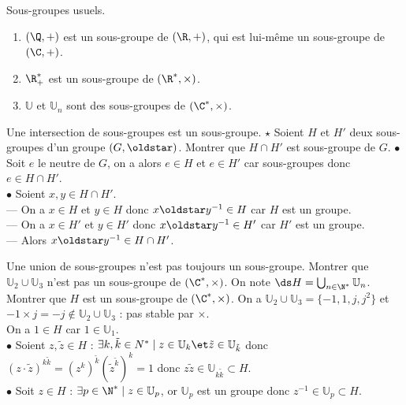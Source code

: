 \documentclass[11pt]{article}
\begin{document}
\begin{prop}{Sous-groupes usuels.}{}
    \begin{enumerate}
        \item $(\Q,+)$ est un sous-groupe de $(\R,+)$, qui est lui-même un sous-groupe de $(\C,+)$.
        \item $\R_+^*$ est un sous-groupe de $(\R^*,\times)$.
        \item $\mathbb{U}$ et $\mathbb{U}_n$ sont des sous-groupes de $(\C^*, \times)$.
    \end{enumerate}
\end{prop}

\begin{ex}{Une intersection de sous-groupes est un sous-groupe. $\star$}{}
    Soient $H$ et $H'$ deux sous-groupes d'un groupe $(G,\s)$. Montrer que $H\cap H'$ est sous-groupe de $G$.
    \tcblower
    $\bullet$ Soit $e$ le neutre de $G$, on a alors $e\in H$ et $e\in H'$ car sous-groupes donc $e\in H\cap H'$.\\
    $\bullet$ Soient $x,y\in H\cap H'$.\\
    --- On a $x\in H$ et $y\in H$ donc $x\s y^{-1}\in H$ car $H$ est un groupe.\\
    --- On a $x\in H'$ et $y\in H'$ donc $x\s y^{-1}\in H'$ car $H'$ est un groupe.\\
    --- Alors $x\s y^{-1}\in H\cap H'$.
\end{ex}

\pagebreak

\begin{ex}{Une union de sous-groupes n'est pas toujours un sous-groupe.}{}
    Montrer que $\mathbb{U}_2\cup\mathbb{U}_3$ n'est pas un sous-groupe de $(\C^*,\times)$.\n
    On note $\ds H=\bigcup_{n\in\N^*}\mathbb{U}_n$. Montrer que $H$ est un sous-groupe de $(\C^*,\times)$.
    \tcblower
     On a $\mathbb{U}_2\cup \mathbb{U}_3=\{-1,1,j,j^2\}$ et $-1\times j = -j \notin \mathbb{U}_2\cup\mathbb{U}_3$ : pas stable par $\times$.\\
     On a $1\in H$ car $1\in \mathbb{U}_1$.\\
    $\bullet$ Soient $z,\tilde{z}\in H$ : $\exists k,\tilde{k}\in N^* \mid z \in \mathbb{U}_k \et \tilde{z}\in\mathbb{U}_{\tilde{k}}$ donc $(z\cdot\tilde{z})^{k\tilde{k}}=(z^{k})^{\tilde{k}}(\tilde{z}^{\tilde{k}})^k=1$ donc $z\tilde{z}\in\mathbb{U}_{k\tilde{k}}\subset H$.\\
    $\bullet$ Soit $z\in H$ : $\exists p \in \N^* \mid z \in \mathbb{U}_p$, or $\mathbb{U}_p$ est un groupe donc $z^{-1}\in\mathbb{U}_p\subset H$.
\end{ex}
\end{document}
